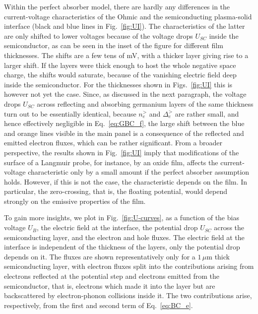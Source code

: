 \documentclass[pre,reprint,floats]{revtex4-1}
\begin{document}
Within the perfect absorber model, there are hardly any differences in the current-voltage 
characteristics of the Ohmic and the semiconducting plasma-solid interface (black and blue 
lines in Fig.~\ref{fig:UI}). The characteristics of the latter are 
only shifted to lower voltages because of the voltage drops $U_{SC}$ inside the semiconductor, as 
can be seen in the inset of the figure for different film thicknesses. The shifts are a few tens 
of mV, with a thicker layer giving rise to a larger shift. If the layers were thick enough to host the 
whole negative space charge, the shifts would saturate, because of the vanishing electric field deep
inside the semiconductor. For the thicknesses shown in Figs.~\ref{fig:UI} this is however not yet the 
case. Since, as discussed in the next paragraph, the voltage drops $U_{SC}$ across reflecting and 
absorbing germanium layers of the same thickness turn out to be essentially identical, because $n_e^>$ 
and $\Delta_e^>$ are rather small, and hence effectively negligible in Eq.~\eqref{eq:GBC_f}, the large 
shift between the blue and orange lines visible in the main panel is a consequence of the 
reflected and emitted electron fluxes, which can be rather significant. From a broader perspective, 
the results shown in Fig.~\ref{fig:UI} imply that modifications of the surface of a Langmuir probe, 
for instance, by an oxide film, affects the current-voltage characteristic only by a small amount if 
the perfect absorber assumption holds. However, if this is not the case, the characteristic depends 
on the film. In particular, the zero-crossing, that is, the floating potential, would depend strongly 
on the emissive properties of the film.

To gain more insights, we plot in Fig.~\ref{fig:U-curves}, as a function of the bias voltage $U_B$, the 
electric field at the interface, the potential drop $U_{SC}$ across the semiconducting layer, and the 
electron and hole fluxes. The electric field at the interface is independent of the thickness of the 
layers, only the potential drop depends on it. The fluxes are shown representatively only for a 
$1\,\mu\mathrm{m}$ thick semiconducting layer, with electron fluxes split into the contributions arising 
from electrons reflected at the potential step and electrons emitted from the semiconductor, that is, 
electrons which made it into the layer but are backscattered by electron-phonon collisions inside it. The 
two contributions arise, respectively, from the first and second term of Eq.~\eqref{eq:BC_e}. 
\end{document}
